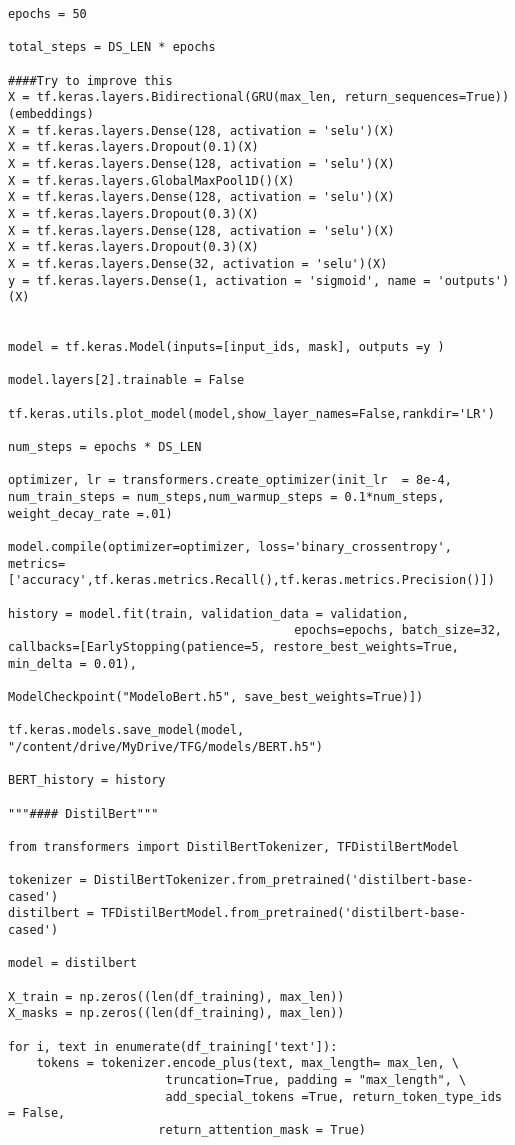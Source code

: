 \documentclass[10pt,riqno,a4paper,twoside]{article}\usepackage[]{graphicx}\usepackage[]{color}
\begin{document}
\begin{lstlisting}
epochs = 50

total_steps = DS_LEN * epochs

####Try to improve this 
X = tf.keras.layers.Bidirectional(GRU(max_len, return_sequences=True))(embeddings)
X = tf.keras.layers.Dense(128, activation = 'selu')(X)
X = tf.keras.layers.Dropout(0.1)(X)
X = tf.keras.layers.Dense(128, activation = 'selu')(X)
X = tf.keras.layers.GlobalMaxPool1D()(X)
X = tf.keras.layers.Dense(128, activation = 'selu')(X)
X = tf.keras.layers.Dropout(0.3)(X)
X = tf.keras.layers.Dense(128, activation = 'selu')(X)
X = tf.keras.layers.Dropout(0.3)(X)
X = tf.keras.layers.Dense(32, activation = 'selu')(X)
y = tf.keras.layers.Dense(1, activation = 'sigmoid', name = 'outputs')(X)


model = tf.keras.Model(inputs=[input_ids, mask], outputs =y )

model.layers[2].trainable = False

tf.keras.utils.plot_model(model,show_layer_names=False,rankdir='LR')

num_steps = epochs * DS_LEN

optimizer, lr = transformers.create_optimizer(init_lr  = 8e-4, num_train_steps = num_steps,num_warmup_steps = 0.1*num_steps, weight_decay_rate =.01)

model.compile(optimizer=optimizer, loss='binary_crossentropy', metrics=['accuracy',tf.keras.metrics.Recall(),tf.keras.metrics.Precision()])

history = model.fit(train, validation_data = validation, 
                                        epochs=epochs, batch_size=32, callbacks=[EarlyStopping(patience=5, restore_best_weights=True, min_delta = 0.01), 
                                       ModelCheckpoint("ModeloBert.h5", save_best_weights=True)])

tf.keras.models.save_model(model, "/content/drive/MyDrive/TFG/models/BERT.h5")

BERT_history = history

"""#### DistilBert"""

from transformers import DistilBertTokenizer, TFDistilBertModel

tokenizer = DistilBertTokenizer.from_pretrained('distilbert-base-cased') 
distilbert = TFDistilBertModel.from_pretrained('distilbert-base-cased')

model = distilbert

X_train = np.zeros((len(df_training), max_len))
X_masks = np.zeros((len(df_training), max_len))

for i, text in enumerate(df_training['text']):
    tokens = tokenizer.encode_plus(text, max_length= max_len, \
                      truncation=True, padding = "max_length", \
                      add_special_tokens =True, return_token_type_ids = False,
                     return_attention_mask = True)
    

\end{lstlisting}
\end{document}
